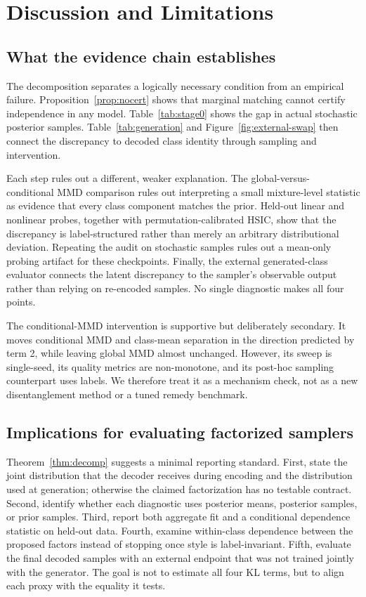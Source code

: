 \documentclass{article}
\begin{document}
\section{Discussion and Limitations}
\label{sec:discussion}

\iffalse %

\subsection{What the evidence chain establishes}

The decomposition separates a logically necessary condition from an
empirical failure.  Proposition~\ref{prop:nocert} shows that marginal matching
cannot certify independence in any model.  Table~\ref{tab:stage0} shows the
gap in actual stochastic posterior samples.  Table~\ref{tab:generation}
and Figure~\ref{fig:external-swap} then connect the discrepancy to decoded
class identity through sampling and intervention.

Each step rules out a different, weaker explanation.  The global-versus-
conditional MMD comparison rules out interpreting a small mixture-level
statistic as evidence that every class component matches the prior.  Held-out
linear and nonlinear probes, together with permutation-calibrated HSIC, show
that the discrepancy is label-structured rather than merely an arbitrary
distributional deviation.  Repeating the audit on stochastic samples rules
out a mean-only probing artifact for these checkpoints.  Finally, the
external generated-class evaluator connects the latent discrepancy to the
sampler's observable output rather than relying on re-encoded samples.  No
single diagnostic makes all four points.

The conditional-MMD intervention is supportive but deliberately secondary.
It moves conditional MMD and class-mean separation in the direction predicted
by term 2, while leaving global MMD almost unchanged.  However, its sweep is
single-seed, its quality metrics are non-monotone, and its post-hoc sampling
counterpart uses labels.  We therefore treat it as a mechanism check, not as
a new disentanglement method or a tuned remedy benchmark.

\subsection{Implications for evaluating factorized samplers}

Theorem~\ref{thm:decomp} suggests a minimal reporting standard.  First, state
the joint distribution that the decoder receives during encoding and the
distribution used at generation; otherwise the claimed factorization has no
testable contract.  Second, identify whether each diagnostic uses posterior
means, posterior samples, or prior samples.  Third, report both aggregate fit
and a conditional dependence statistic on held-out data.  Fourth, examine
within-class dependence between the proposed factors instead of stopping once
style is label-invariant.  Fifth, evaluate the final decoded samples with an
external endpoint that was not trained jointly with the generator.  The goal
is not to estimate all four KL terms, but to align each proxy with the
equality it tests.
\end{document}
